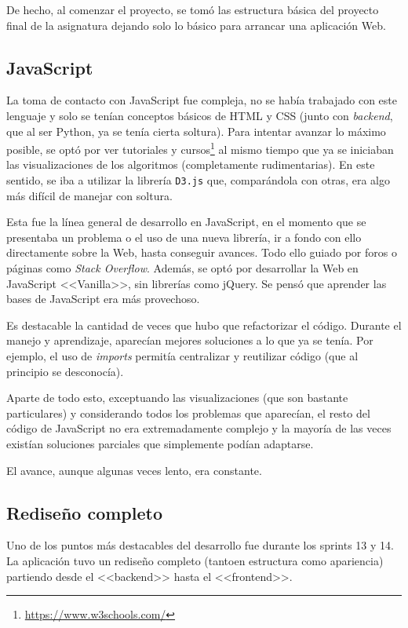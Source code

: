 De hecho, al comenzar el proyecto, se tomó las estructura básica del proyecto
final de la asignatura dejando solo lo básico para arrancar una aplicación Web.

\subsection{JavaScript}
La toma de contacto con JavaScript fue compleja, no se había trabajado con este
lenguaje y solo se tenían conceptos básicos de HTML y CSS (junto con
\emph{backend}, que al ser Python, ya se tenía cierta soltura). Para intentar
avanzar lo máximo posible, se optó por ver tutoriales y
cursos\footnote{\url{https://www.w3schools.com/}} al mismo tiempo que ya se
iniciaban las visualizaciones de los algoritmos (completamente rudimentarias).
En este sentido, se iba a utilizar la librería \texttt{D3.js} que, comparándola
con otras, era algo más difícil de manejar con soltura.

Esta fue la línea general de desarrollo en JavaScript, en el momento que se
presentaba un problema o el uso de una nueva librería, ir a fondo con ello
directamente sobre la Web, hasta conseguir avances. Todo ello guiado por foros o
páginas como \textit{Stack Overflow}. Además, se optó por desarrollar la Web en
JavaScript <<Vanilla>>, sin librerías como jQuery. Se pensó que aprender las
bases de JavaScript era más provechoso.

Es destacable la cantidad de veces que hubo que refactorizar el código. Durante
el manejo y aprendizaje, aparecían mejores soluciones a lo que ya se tenía. Por
ejemplo, el uso de \emph{imports} permitía centralizar y reutilizar código (que
al principio se desconocía).

Aparte de todo esto, exceptuando las visualizaciones (que son bastante
particulares) y considerando todos los problemas que aparecían, el resto del
código de JavaScript no era extremadamente complejo y la mayoría de las veces
existían soluciones parciales que simplemente podían adaptarse. 

El avance, aunque algunas veces lento, era constante.

\subsection{Rediseño completo}

Uno de los puntos más destacables del desarrollo fue durante los sprints 13 y
14. La aplicación tuvo un rediseño completo (tantoen  estructura como
apariencia) partiendo desde el <<backend>> hasta el <<frontend>>.

